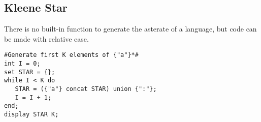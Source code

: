\documentclass{article}
\begin{document}
\subsection{Kleene Star}
There is no built-in function to generate the asterate of a language, but code can be made with relative ease.
\begin{lstlisting}
#Generate first K elements of {"a"}*#
int I = 0;
set STAR = {};
while I < K do
   STAR = ({"a"} concat STAR) union {":"};
   I = I + 1;
end;
display STAR K;       
\end{lstlisting}
\end{document}
